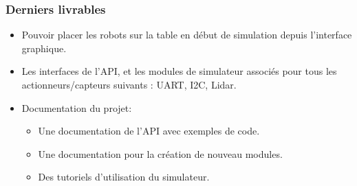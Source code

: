     \subsubsection{Derniers livrables}
    \begin{itemize}
        
        \item{Pouvoir placer les robots sur la table en début de simulation depuis l'interface graphique.}
        
        \item{Les interfaces de l'API, et les modules de simulateur associés pour tous les actionneurs/capteurs suivants : UART, I2C, Lidar.}
        
        \item{Documentation du projet:}
			\begin{itemize}
				\item Une documentation de l'API avec exemples de code.
				\item Une documentation pour la création de nouveau modules.
				\item Des tutoriels d'utilisation du simulateur.
			\end{itemize}
        
    \end{itemize}
